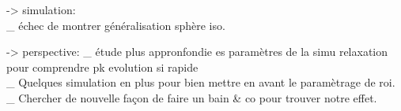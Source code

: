 \documentclass[a4paper,11pt,twoside,openright]{report}
\renewcommand{\(}{\ensuremath{\left(}}
\renewcommand{\)}{\ensuremath{\right)}}
\begin{document}
			\newpage

			-> simulation: \\
				\_ échec de montrer généralisation sphère iso.

			-> perspective:
				\_ étude plus appronfondie es paramètres de la simu relaxation pour comprendre pk evolution si rapide \\
				\_ Quelques simulation en plus pour bien mettre en avant le paramètrage de roi. \\
				\_ Chercher de nouvelle façon de faire un bain \& co pour trouver notre effet.

	
	

	\appendix


\end{document}
